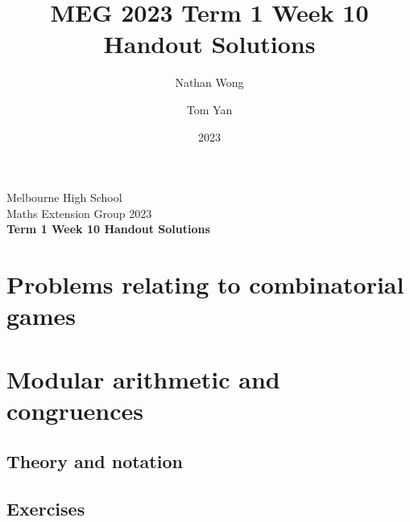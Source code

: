 \documentclass[a4paper,10pt]{article}
\title{MEG 2023 Term 1 Week 10 Handout Solutions}
\author{Nathan Wong\and Tom Yan}
\date{2023}
\newcommand{\thetitle}{Term 1 Week 10 Handout Solutions}
\begin{document}
\noindent Melbourne High School\\
Maths Extension Group 2023\\
\textbf{\thetitle}\\
\section{Problems relating to combinatorial games}
\section{Modular arithmetic and congruences}
\subsection{Theory and notation}
\subsection{Exercises}
\end{document}
